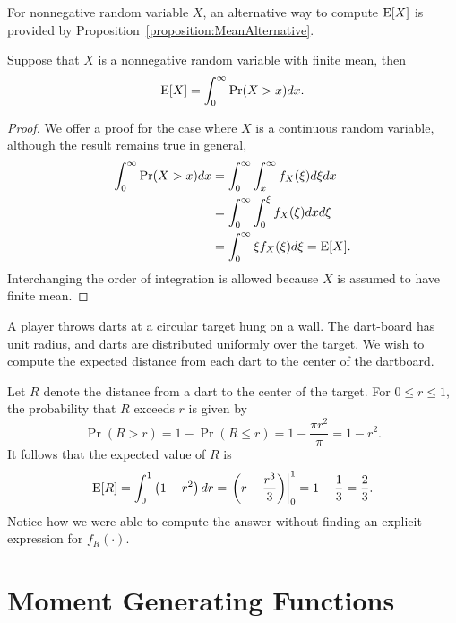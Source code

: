 For nonnegative random variable $X$, an alternative way to compute $\mathrm{E} [X]$ is provided by Proposition~\ref{proposition:MeanAlternative}. 

\begin{proposition} \label{proposition:MeanAlternative}
Suppose that $X$ is a nonnegative random variable with finite mean, then
\begin{equation*}
\mathrm{E} [X] = \int_0^{\infty} \Pr (X > x) dx .
\end{equation*}
\end{proposition}
\begin{proof}
We offer a proof for the case where $X$ is a continuous random variable, although the result remains true in general,
\begin{equation*}
\begin{split}
\int_0^{\infty} \Pr (X > x) dx
&= \int_0^{\infty} \int_x^{\infty} f_X(\xi) d\xi dx \\
&= \int_0^{\infty} \int_0^{\xi} f_X(\xi) dx d\xi \\
&= \int_0^{\infty} \xi f_X(\xi) d\xi
= \mathrm{E} [X] .
\end{split}
\end{equation*}
Interchanging the order of integration is allowed because $X$ is assumed to have finite mean.
\end{proof}

\begin{example}
A player throws darts at a circular target hung on a wall.
The dart-board has unit radius, and darts are distributed uniformly over the target.
We wish to compute the expected distance from each dart to the center of the dartboard.

Let $R$ denote the distance from a dart to the center of the target.
For $0 \leq r \leq 1$, the probability that $R$ exceeds $r$ is given by
\begin{equation*}
\Pr (R > r) = 1 - \Pr (R \leq r) = 1 - \frac{\pi r^2}{\pi} = 1 - r^2 .
\end{equation*}
It follows that the expected value of $R$ is
\begin{equation*}
\mathrm{E} [R] = \int_0^1 \left( 1 - r^2 \right) dr
= \left.  \left( r - \frac{r^3}{3} \right) \right|_0^1
= 1 - \frac{1}{3} = \frac{2}{3} .
\end{equation*}
Notice how we were able to compute the answer without finding an explicit expression for $f_R (\cdot)$.
\end{example}


\section{Moment Generating Functions}

